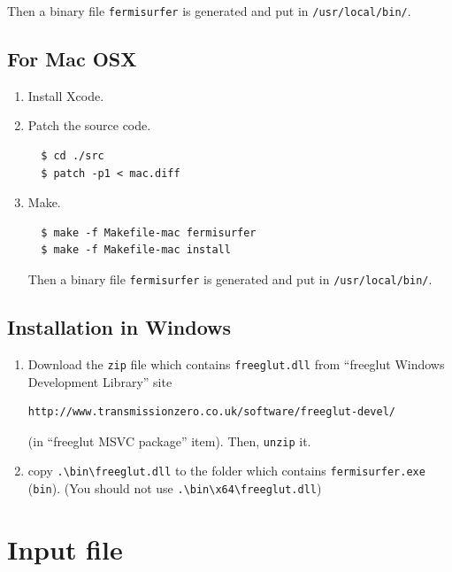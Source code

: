 \documentclass[12pt]{article}
\begin{document}
Then a binary file \texttt{fermisurfer} is generated and put 
in \verb|/usr/local/bin/|.

\subsection{For Mac OSX}

\begin{enumerate}

\item Install Xcode.

\item Patch the source code.
\begin{verbatim}
  $ cd ./src
  $ patch -p1 < mac.diff
\end{verbatim}

\item Make.
\begin{verbatim}
  $ make -f Makefile-mac fermisurfer
  $ make -f Makefile-mac install
\end{verbatim}

Then a binary file \texttt{fermisurfer} is generated and put 
in \verb|/usr/local/bin/|.

\end{enumerate}

\subsection{Installation in Windows}
 
\begin{enumerate}

\item Download the \verb|zip| file which contains \verb|freeglut.dll|
from ``freeglut Windows Development Library'' site
\begin{verbatim}
http://www.transmissionzero.co.uk/software/freeglut-devel/
\end{verbatim}
(in ``freeglut MSVC package'' item).
Then, \verb|unzip| it.

\item copy \verb|.\bin\freeglut.dll| to the folder which contains
 \verb|fermisurfer.exe| (\verb|bin|).
 (You should not use \verb|.\bin\x64\freeglut.dll|)

\end{enumerate}

\section{Input file}
\end{document}
